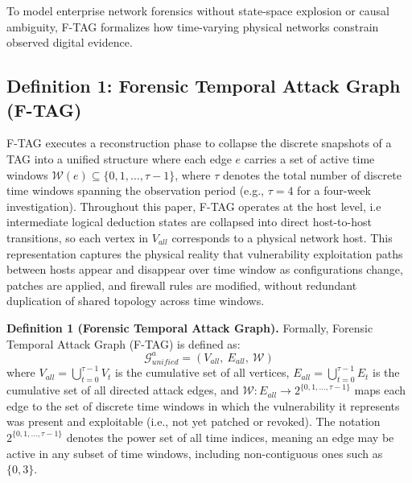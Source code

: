 \documentclass[12pt]{article}
\begin{document}
To model enterprise network forensics without state-space explosion or causal ambiguity, F-TAG formalizes how time-varying physical networks constrain observed digital evidence.

\subsection{Definition 1: Forensic Temporal Attack Graph (F-TAG)}\label{sec:def1}

F-TAG executes a reconstruction phase to collapse the discrete snapshots of a TAG into a unified structure where each edge $e$ carries a set of active time windows $\mathcal{W}(e) \subseteq \{0, 1, \dots, \tau-1\}$, where $\tau$ denotes the total number of discrete time windows spanning the observation period (e.g., $\tau = 4$ for a four-week investigation). Throughout this paper, F-TAG operates at the host level, i.e intermediate logical deduction states are collapsed into direct host-to-host transitions, so each vertex in $V_{all}$ corresponds to a physical network host. This representation captures the physical reality that vulnerability exploitation paths between hosts appear and disappear over time window as configurations change, patches are applied, and firewall rules are modified, without redundant duplication of shared topology across time windows.

\textbf{Definition 1 (Forensic Temporal Attack Graph).} Formally, Forensic Temporal Attack Graph (F-TAG) is defined as:
\begin{equation}
\mathcal{G}^a_{unified} = \left(V_{all},\ E_{all},\ \mathcal{W}\right)
\end{equation}
where $V_{all} = \bigcup_{t=0}^{\tau-1} V_t$ is the cumulative set of all vertices, $E_{all} = \bigcup_{t=0}^{\tau-1} E_t$ is the cumulative set of all directed attack edges, and $\mathcal{W}: E_{all} \to 2^{\{0, 1, \dots, \tau-1\}}$ maps each edge to the set of discrete time windows in which the vulnerability it represents was present and exploitable (i.e., not yet patched or revoked). The notation $2^{\{0,1,\dots,\tau-1\}}$ denotes the power set of all time indices, meaning an edge may be active in any subset of time windows, including non-contiguous ones such as $\{0, 3\}$.
\end{document}
